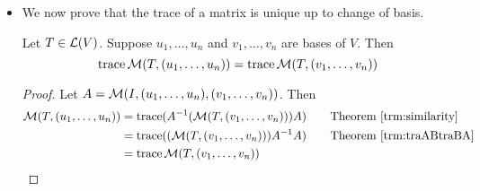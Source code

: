 \documentclass[../main.tex]{subfiles}
\begin{document}
\begin{itemize}
\begin{theorem}
\begin{proof}
\begin{align*}
                A &=
                \begin{pmatrix}
                    A_{1,1} & \cdots & A_{1,n}\\
                    \vdots &  & \vdots\\
                    A_{n,1} & \cdots & A_{n,n}\\
                \end{pmatrix}&
                B &=
                \begin{pmatrix}
                    B_{1,1} & \cdots & B_{1,n}\\
                    \vdots &  & \vdots\\
                    B_{n,1} & \cdots & B_{n,n}\\
                \end{pmatrix}
            \end{align*}
            The $j^\text{th}$ diagonal entry of $AB$ is by the definition of matrix multiplication $\sum_{k=1}^nA_{j,k}B_{k,j}$. Thus,
            \begin{align*}
                \tra(AB) &= \sum_{j=1}^n\sum_{k=1}^nA_{j,k}B_{k,j}\\
                &= \sum_{k=1}^n\sum_{j=1}^nB_{k,j}A_{j,k}\\
                &= \tra(BA)
            \end{align*}
            as desired.
        \end{proof}
    \end{theorem}
    \item We now prove that the trace of a matrix is unique up to change of basis.
    \begin{theorem}\label{trm:traTutraTv}
        Let $T\in\mathcal{L}(V)$. Suppose $u_1,\dots,u_n$ and $v_1,\dots,v_n$ are bases of $V$. Then
        \begin{equation*}
            \operatorname{trace}\mathcal{M}(T,(u_1,\dots,u_n)) = \operatorname{trace}\mathcal{M}(T,(v_1,\dots,v_n))
        \end{equation*}
        \begin{proof}
            Let $A=\mathcal{M}(I,(u_1,\dots,u_n),(v_1,\dots,v_n))$. Then
            \begin{align*}
                \mat{T,(u_1,\dots,u_n)} &= \tra(A^{-1}(\mat{T,(v_1,\dots,v_n)})A)\tag*{Theorem \ref{trm:similarity}}\\
                &= \tra((\mat{T,(v_1,\dots,v_n)})A^{-1}A)\tag*{Theorem \ref{trm:traABtraBA}}\\
                &= \tra\mat{T,(v_1,\dots,v_n)}
            \end{align*}

\end{proof}
\end{theorem}
\end{itemize}
\end{document}
